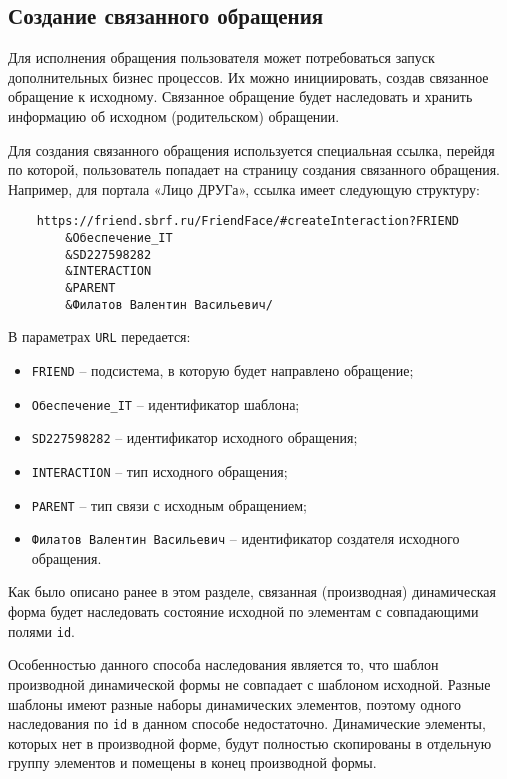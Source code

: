 \documentclass[../index.tex]{subfiles}
\begin{document}
\subsection{Создание связанного обращения}
Для исполнения обращения пользователя может потребоваться запуск дополнительных бизнес процессов.
Их можно инициировать, создав связанное обращение к исходному.
Связанное обращение будет наследовать и хранить информацию об исходном (родительском) обращении.


Для создания связанного обращения используется специальная ссылка, перейдя по которой,
пользователь попадает на страницу создания связанного обращения.
Например, для портала «Лицо ДРУГа», ссылка имеет следующую структуру:


\begin{verbatim}
    https://friend.sbrf.ru/FriendFace/#createInteraction?FRIEND
        &Обеспечение_IT
        &SD227598282
        &INTERACTION
        &PARENT
        &Филатов Валентин Васильевич/
\end{verbatim}


В параметрах \verb|URL| передается:
\begin{itemize}
    \item \verb|FRIEND| – подсистема, в которую будет направлено обращение;
    \item \verb|Обеспечение_IT| – идентификатор шаблона;
    \item \verb|SD227598282| – идентификатор исходного обращения;
    \item \verb|INTERACTION| – тип исходного обращения;
    \item \verb|PARENT| – тип связи с исходным обращением;
    \item \verb|Филатов Валентин Васильевич| – идентификатор создателя исходного обращения.
\end{itemize}


Как было описано ранее в этом разделе, связанная (производная) динамическая форма
будет наследовать состояние исходной по элементам с совпадающими полями \verb|id|.


Особенностью данного способа наследования является то,
что шаблон производной динамической формы не совпадает с шаблоном исходной.
Разные шаблоны имеют разные наборы динамических элементов,
поэтому одного наследования по \verb|id| в данном способе недостаточно.
Динамические элементы, которых нет в производной форме,
будут полностью скопированы в отдельную группу элементов и помещены в конец производной формы.
\end{document}
